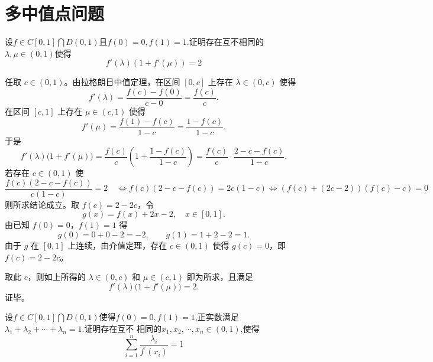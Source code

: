 \section{多中值点问题}
\begin{example}[$f'\left(\lambda\right)\left(1+f'\left(\mu\right)\right)=2$]
    设$f\in C\left[0,1\right]\bigcap D\left(0,1\right)$且$f\left(0\right)=0,f\left(1\right)=1.$证明存在互不相同的$\lambda,\mu\in\left(0,1\right)$使得\[f'\left(\lambda\right)\left(1+f'\left(\mu\right)\right)=2\]
\end{example}
\begin{solution}
任取 $c\in(0,1)$。由拉格朗日中值定理，在区间 $[0,c]$ 上存在 $\lambda\in(0,c)$ 使得
\[
f'(\lambda)=\frac{f(c)-f(0)}{c-0}=\frac{f(c)}{c}.
\]
在区间 $[c,1]$ 上存在 $\mu\in(c,1)$ 使得
\[
f'(\mu)=\frac{f(1)-f(c)}{1-c}=\frac{1-f(c)}{1-c}.
\]
于是
\[
f'(\lambda)\bigl(1+f'(\mu)\bigr)=\frac{f(c)}{c}\left(1+\frac{1-f(c)}{1-c}\right)=\frac{f(c)}{c}\cdot\frac{2-c-f(c)}{1-c}.
\]
若存在 $c\in(0,1)$ 使
\[
\frac{f(c)(2-c-f(c))}{c(1-c)}=2\quad\Leftrightarrow f(c)(2-c-f(c))=2c(1-c)\Leftrightarrow (f(c)+(2c-2))(f(c)-c)=0
\]
则所求结论成立。取 $f(c)=2-2c$，令
\[
g(x)=f(x)+2x-2,\quad x\in[0,1].
\]
由已知 $f(0)=0$，$f(1)=1$ 得
\[
g(0)=0+0-2=-2,\qquad g(1)=1+2-2=1.
\]
由于 $g$ 在 $[0,1]$ 上连续，由介值定理，存在 $c\in(0,1)$ 使得 $g(c)=0$，即 $f(c)=2-2c$。

取此 $c$，则如上所得的 $\lambda\in(0,c)$ 和 $\mu\in(c,1)$ 即为所求，且满足
\[
f'(\lambda)\bigl(1+f'(\mu)\bigr)=2.
\]
证毕。
\end{solution}
\newpage
\begin{example}[$\sum_{i=1}^n\frac{\lambda_i}{f^{\prime}\left(x_i\right)}=1$]
    设$f\in C\left[0,1\right]\bigcap D\left(0,1\right)$使得$f\left(0\right)=0,f\left(1\right)=1$,正实数满足$\lambda_1+\lambda_2+\cdots+\lambda_n=1.$证明存在互不
相同的$x_1,x_2,\cdots,x_n\in(0,1)$,使得
$$\sum_{i=1}^n\frac{\lambda_i}{f^{\prime}\left(x_i\right)}=1$$
\end{example}
